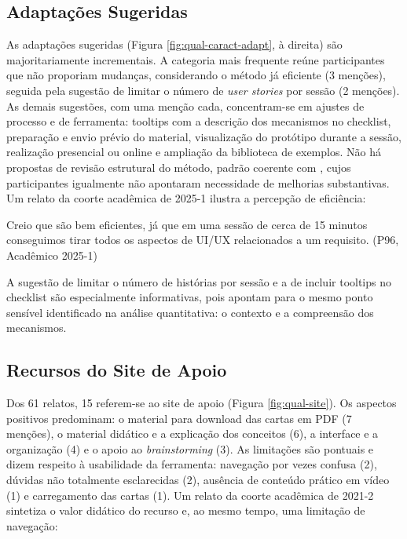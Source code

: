 \FloatBarrier

\subsection{Adaptações Sugeridas}
\label{sec:res-qual-adaptacoes}

As adaptações sugeridas (Figura \ref{fig:qual-caract-adapt}, à direita) são majoritariamente incrementais. A categoria mais frequente reúne participantes que não proporiam mudanças, considerando o método já eficiente (3 menções), seguida pela sugestão de limitar o número de \textit{user stories} por sessão (2 menções). As demais sugestões, com uma menção cada, concentram-se em ajustes de processo e de ferramenta: tooltips com a descrição dos mecanismos no checklist, preparação e envio prévio do material, visualização do protótipo durante a sessão, realização presencial ou online e ampliação da biblioteca de exemplos. Não há propostas de revisão estrutural do método, padrão coerente com , cujos participantes igualmente não apontaram necessidade de melhorias substantivas. Um relato da coorte acadêmica de 2025-1 ilustra a percepção de eficiência:

\begin{citacao}
Creio que são bem eficientes, já que em uma sessão de cerca de 15 minutos conseguimos tirar todos os aspectos de UI/UX relacionados a um requisito. (P96, Acadêmico 2025-1)
\end{citacao}

A sugestão de limitar o número de histórias por sessão e a de incluir tooltips no checklist são especialmente informativas, pois apontam para o mesmo ponto sensível identificado na análise quantitativa: o contexto e a compreensão dos mecanismos.

\subsection{Recursos do Site de Apoio}
\label{sec:res-qual-site}

Dos 61 relatos, 15 referem-se ao site de apoio (Figura \ref{fig:qual-site}). Os aspectos positivos predominam: o material para download das cartas em PDF (7 menções), o material didático e a explicação dos conceitos (6), a interface e a organização (4) e o apoio ao \textit{brainstorming} (3). As limitações são pontuais e dizem respeito à usabilidade da ferramenta: navegação por vezes confusa (2), dúvidas não totalmente esclarecidas (2), ausência de conteúdo prático em vídeo (1) e carregamento das cartas (1). Um relato da coorte acadêmica de 2021-2 sintetiza o valor didático do recurso e, ao mesmo tempo, uma limitação de navegação:

